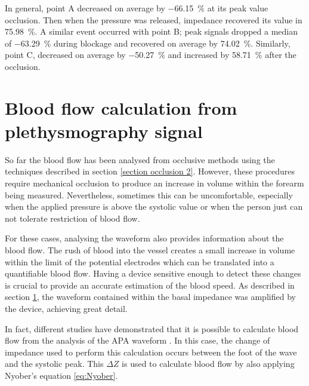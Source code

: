 In general, point A decreased on average by \SI{-66.15}{\percent} at its peak value occlusion. Then when the pressure was released, impedance recovered its value in \SI{75.98}{\percent}. A similar event occurred with point B; peak signals dropped a median of \SI{-63.29}{\percent} during blockage and recovered on average by \SI{74.02}{\percent}. Similarly, point C, decreased on average by \SI{-50.27}{\percent}  and increased by \SI{58.71}{\percent} after the occlusion.

\section{Blood flow calculation from plethysmography signal}
\label{section apa 3}
So far the blood flow has been analysed from occlusive methods using the techniques described in section \ref{section occlusion 2}. However, these procedures require mechanical occlusion to produce an increase in volume within the forearm being measured. Nevertheless, sometimes this can be uncomfortable, especially when the applied pressure is above the systolic value or when the person just can not tolerate restriction of blood flow.

For these cases, analysing the waveform also provides information about the blood flow. The rush of blood into the vessel creates a small increase in volume within the limit of the potential electrodes which can be translated into a quantifiable blood flow. Having a device sensitive enough to detect these changes is crucial to provide an accurate estimation of the blood speed. As described in section \ref{section apa 3}, the waveform contained within the basal impedance was amplified by the device, achieving great detail.

In fact, different studies have demonstrated that it is possible to calculate blood flow from the analysis of the APA waveform \cite{corciova2011peripheral, costeloe1980continuous, brown1975impedance}. In this case, the change of impedance used to perform this calculation occurs between the foot of the wave and the systolic peak. This $\Delta Z$ is used to calculate blood flow by also applying Nyober's equation \ref{eq:Nyober}.

